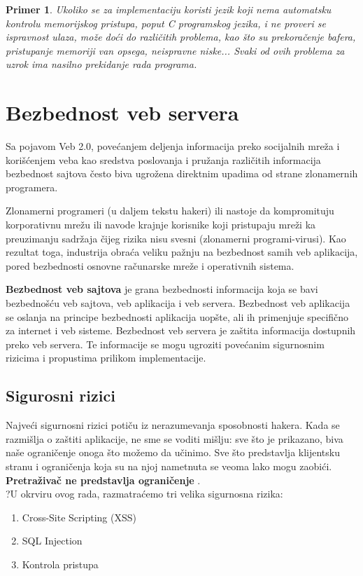 \documentclass[a4paper]{article}
\newtheorem{primer}{Primer}[section]
\begin{document}
\begin{primer}
	\label{primer5}
	Ukoliko se za implementaciju koristi jezik koji nema automatsku kontrolu memorijskog pristupa, poput C programskog jezika, i ne proveri se ispravnost ulaza, može doći do različitih problema, kao što su prekoračenje bafera, pristupanje memoriji van opsega, neispravne niske... Svaki od ovih problema za uzrok ima nasilno prekidanje rada programa.
\end{primer}

\section{Bezbednost veb servera}


Sa pojavom Veb 2.0, pove\'{c}anjem deljenja informacija preko socijalnih mre\v{z}a i kori\v{s}\'{c}enjem veba kao sredstva poslovanja i pru\v{z}anja razli\v{c}itih informacija bezbednost sajtova \v{c}esto biva ugro\v{z}ena direktnim upadima od strane zlonamernih programera.

Zlonamerni programeri (u daljem tekstu hakeri) ili nastoje da kompromituju korporativnu mre\v{z}u ili navode krajnje korisnike koji pristupaju mre\v{z}i ka preuzimanju sadr\v{z}aja \v{c}ijeg rizika nisu svesni (zlonamerni programi-virusi). Kao rezultat toga, industrija obra\'{c}a veliku pa\v{z}nju na bezbednost samih veb aplikacija, pored bezbednosti osnovne ra\v{c}unarske mre\v{z}e i operativnih sistema.

\textbf{Bezbednost veb sajtova} je grana bezbednosti informacija koja se bavi bezbedno\v{s}\'{c}u veb sajtova, veb aplikacija i veb servera. Bezbednost veb aplikacija se oslanja na principe bezbednosti aplikacija uop\v{s}te, ali ih primenjuje specifi\v{c}no za internet i veb sisteme.
Bezbednost veb servera je za\v{s}tita informacija dostupnih preko veb servera. Te informacije se mogu ugroziti pove\'{c}anim sigurnosnim rizicima i propustima prilikom implementacije.


\subsection{Sigurosni rizici}
Najve\'{c}i sigurnosni rizici poti\v{c}u iz nerazumevanja sposobnosti hakera. Kada se razmi\v{s}lja o za\v{s}titi aplikacije, ne sme se voditi mi\v{s}lju: sve \v{s}to je prikazano, biva na\v{s}e ograni\v{c}enje onoga \v{s}to mo\v{z}emo da u\v{c}inimo. Sve \v{s}to predstavlja klijentsku stranu i ograni\v{c}enja koja su na njoj nametnuta se veoma lako mogu zaobi\'{c}i.
\textbf{Pretra\v{z}iva\v{c} ne predstavlja ograni\v{c}enje }.\\
?U okrviru ovog rada, razmatra\'{c}emo tri velika sigurnosna rizika:
\begin{enumerate}
	\item Cross-Site Scripting (XSS)
	\item SQL Injection
	\item Kontrola pristupa
\end{enumerate}
\newpage
\end{document}
